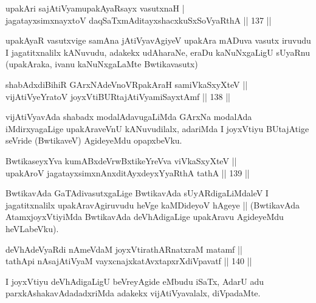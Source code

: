 \begin{shl}
upakAri sajAtiVyamupakAyaRsayx vasutxnaH | \\
jagatayxsimxnayxtoV daqSaTxmAditayxshacxkuSxSoVyaRthA \hfill||  137 ||  
\end{shl}

\begin{artha}
upakAyaR vasutxvige samAna jAtiVyavAgiyeV upakAra mADuva vasutx iruvudu I jagatitxnalilx kANuvudu, adakekx udAharaNe, eraDu kaNuNxgaLigU sUyaRnu (upakAraka, ivanu kaNuNxgaLaMte Bwtikavasutx)
\end{artha}

\begin{shl}
shabAdxdiBihiR GArxNAdeVnoVRpakAraH samiVkaSxyXteV ||  \\
vijAtiVyeYratoV joyxVtiBURtajAtiVyamiSayxtAmf \hfill||  138 ||  
\end{shl}

\begin{artha}
vijAtiVyavAda shabadx modalAdavugaLiMda GArxNa modalAda iMdirxyagaLige upakAraveVnU kANuvudilalx, adariMda I joyxVtiyu BUtajAtige seVride (BwtikaveV) AgideyeMdu opapxbeVku.
\end{artha}

\begin{shl}
BwtikaseyxYva kumABxdeVrwBxtikeYreVva viVkaSxyXteV ||  \\
upakAroV jagatayxsimxnAnxditAyxdeyxYyaRthA tathA \hfill||  139 ||  
\end{shl}

\begin{artha}
BwtikavAda GaTAdivasutxgaLige BwtikavAda sUyARdigaLiMdaleV I jagatitxnalilx upakAravAgiruvudu heVge kaMDideyoV hAgeye || (BwtikavAda AtamxjoyxVtiyiMda BwtikavAda deVhAdigaLige upakAravu AgideyeMdu heVLabeVku).
\end{artha}


\begin{shl}
deVhAdeVyaRdi nAmeVdaM joyxVtirathARnatxraM matamf ||  \\
tathA\s pi nAsajAtiVyaM vayxcnajxkatAvxtapxrXdiVpavatf \hfill||  140 ||  
\end{shl}

\begin{artha}
I joyxVtiyu deVhAdigaLigU beVreyAgide eMbudu iSaTx, AdarU adu parxkAshakavAdadadxriMda adakekx vijAtiVyavalalx, diVpadaMte.
\end{artha}


